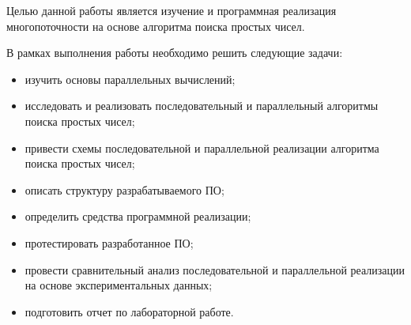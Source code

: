 Целью данной работы является изучение и программная реализация многопоточности на основе алгоритма поиска простых чисел.


В рамках выполнения работы необходимо решить следующие задачи:


\begin{itemize}
	\item изучить основы параллельных вычислений;
	\item исследовать и реализовать последовательный и параллельный алгоритмы поиска простых чисел;
	\item привести схемы последовательной и параллельной реализации алгоритма поиска простых чисел;
	\item описать структуру разрабатываемого ПО;
	\item определить средства программной реализации;
	\item протестировать разработанное ПО;
	\item провести сравнительный анализ последовательной и параллельной реализации на основе экспериментальных данных;
    \item подготовить отчет по лабораторной работе.
\end{itemize}
